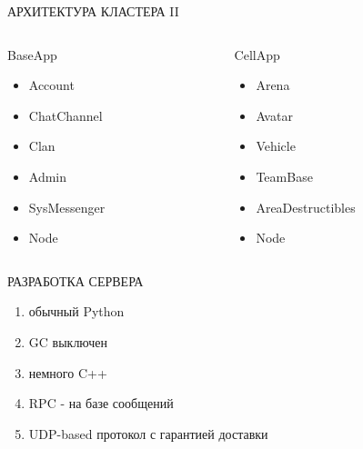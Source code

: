 \documentclass[aspectratio=169]{beamer}
\begin{document}
\begin{frame}{АРХИТЕКТУРА КЛАСТЕРА II}
    \begin{columns}
        \begin{column}{0.4\textwidth}
        \begin{block}{BaseApp}
        \begin{itemize}
            \item Account
            \item ChatChannel
            \item Clan
            \item Admin
            \item SysMessenger
            \item Node
        \end{itemize}
        \end{block}
        \end{column}

        \begin{column}{0.4\textwidth}
        \begin{block}{CellApp}
        \begin{itemize}
            \item Arena
            \item Avatar
            \item Vehicle
            \item TeamBase
            \item AreaDestructibles
            \item Node
        \end{itemize}
        \end{block}
        \end{column}
    \end{columns}
    \vspace*{1cm}
\end{frame}

\begin{frame}{РАЗРАБОТКА СЕРВЕРА}
    \begin{enumerate}
        \item обычный Python
        \item GC выключен
        \item немного C++
        \item RPC - на базе сообщений
        \item UDP-based протокол с гарантией доставки
    \end{enumerate}
\end{frame}
\end{document}
